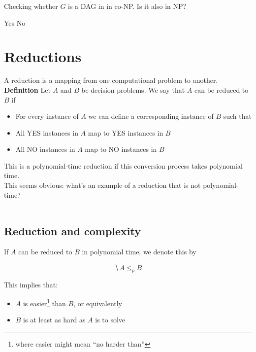 \documentclass[11  pt]{article}
\begin{document}
	\vfill
	
	\begin{Qu}
		Checking whether $G$ is a DAG in in co-NP. Is it also in NP? 
		\begin{itemize}
			\aitem Yes
			\bitem No
		\end{itemize}
		
	\end{Qu}
	\vfill
	\newpage
	\section{Reductions}
	A reduction is a mapping from one computational problem to another.  \\ 
	
	\textbf{Definition} Let $A$ and $B$ be decision problems. We say that $A$ can be reduced to $B$ if
	
	\begin{itemize}
		\item For every instance of $A$ we can define a corresponding instance of $B$ such that
		\item All YES instances in $A$ map to YES instances in $B$
		\item All NO instances in $A$ map to NO instances in $B$
	\end{itemize}
	
	\vfill
	
	This is a polynomial-time reduction if this conversion process takes polynomial time. \\
	
	This seems obvious: what's an example of a reduction that is not polynomial-time? \\ \\
	
	\vfill
	
	\newpage
	\subsection{Reduction and complexity}
	
	If $A$ can be reduced to $B$ in polynomial time, we denote this by 
	
	\begin{equation*}
		\hide{A \leq_p B}
	\end{equation*}
	
	This implies that:
	\begin{itemize}
		\item $A$ is easier\footnote{where easier might mean ``no harder than''} than $B$, or equivalently 
		\item $B$ is at least as hard as $A$ is to solve\\
	\end{itemize} 
	
\end{document}
